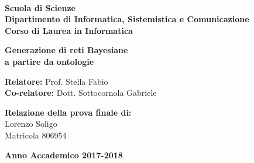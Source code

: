 \documentclass[a4paper,12pt,openright,twoside]{book}
\begin{document}
\frontmatter
\begin{titlepage}
	
	\noindent
	\begin{minipage}[t]{0.18\textwidth}
	\end{minipage}
	\begin{minipage}[t]{0.82\textwidth}
		{
			 \\
			\textbf{Scuola di Scienze} \\
			\textbf{Dipartimento di Informatica, Sistemistica e Comunicazione} \\
			\textbf{Corso di Laurea in Informatica} \\
			\par
		}
	\end{minipage}
	
	\vspace{40mm}
	
	\begin{center}
		{\LARGE{
				\textbf{Generazione di reti Bayesiane \\ a partire da ontologie}
				\par
		}}
	\end{center}
	
	\vspace{50mm}
	
	\noindent
	{\large \textbf{Relatore:} Prof. Stella Fabio } \\
	
	\noindent
	{\large \textbf{Co-relatore:} Dott. Sottocornola Gabriele}
	
	\vspace{15mm}
	
	\begin{flushright}
		{\large \textbf{Relazione della prova finale di:}} \\
		\large{Lorenzo Soligo} \\
		\large{Matricola 806954} 
	\end{flushright}
	
	\vspace{20mm}
	\begin{center}
		{\large{\bf Anno Accademico 2017-2018}}
	\end{center}
	
	\restoregeometry
	
\end{titlepage}

%









\cleardoublepage

\tableofcontents



\backmatter



\end{document}

